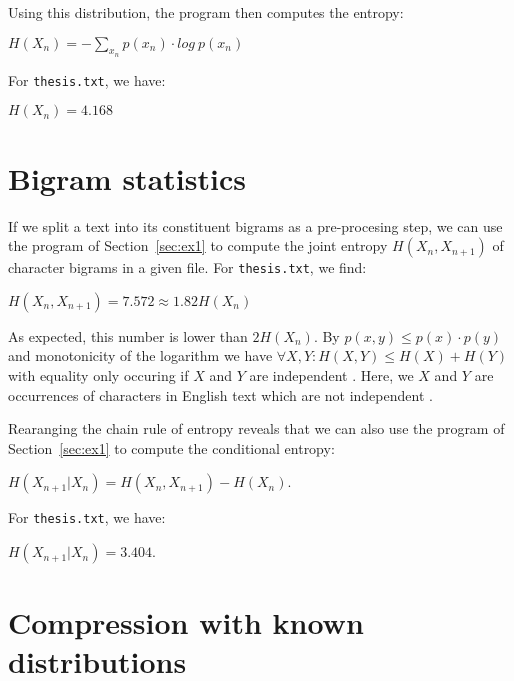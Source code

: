 \documentclass[10pt,a4paper,twoside,onecolumn]{article}
\newcommand*{\thesisTXT}{{\tt thesis.txt}\xspace}
\begin{document}
Using this distribution\footnotemark, the program then computes the entropy:

\begin{center}
    $H(X_n) = -\sum\limits_{x_n} p(x_n) \cdot log~p(x_n)$
\end{center}

For \thesisTXT, we have:

\begin{center}
    $H(X_n) = 4.168$
\end{center}

\section{Bigram statistics}\label{sec:ex2}

If we split a text into its constituent bigrams as a pre-procesing step, we can
use the program of Section~\ref{sec:ex1} to compute the joint entropy $H(X_n,
X_{n+1})$ of character bigrams in a given file. For \thesisTXT, we find:

\begin{center}
    $H(X_n, X_{n+1}) = 7.572 \approx 1.82H(X_n)$
\end{center}

As expected, this number is lower than $2H(X_n)$. By $p(x,y) \le p(x) \cdot
p(y)$ and monotonicity of the logarithm we have $\forall X,Y: H(X, Y) \le H(X) +
H(Y)$ with equality only occuring if $X$ and $Y$ are independent
\cite[p.~138]{mackay}. Here, we $X$ and $Y$ are occurrences of characters in
English text which are not independent \cite[p.~22-24]{mackay}.

Rearanging the chain rule of entropy \cite[p.~139]{mackay} reveals that we can
also use the program of Section~\ref{sec:ex1} to compute the conditional
entropy:

\begin{center}
    $H(X_{n+1} | X_n) = H(X_n, X_{n+1}) - H(X_n)$.
\end{center}

For \thesisTXT, we have:

\begin{center}
    $H(X_{n+1} | X_n) = 3.404$.
\end{center}


\section{Compression with known distributions}\label{sec:ex3}
\end{document}
